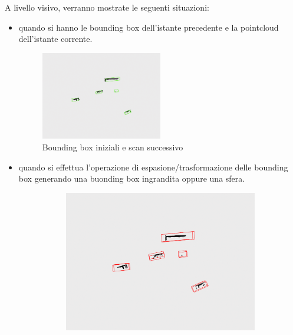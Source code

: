 \documentclass[italian]{report}
\begin{document}
A livello visivo, verranno mostrate le seguenti situazioni:
\begin{itemize}
	\item quando si hanno le bounding box dell'istante precedente e la pointcloud dell'istante corrente.
		\begin{figure}[H]
			\centering
			\includegraphics[width=0.5\textwidth]{startingpoint}
			\footnotesize
			\caption{Bounding box iniziali e scan successivo}
		\end{figure}
	\item quando si effettua l'operazione di espasione/trasformazione delle bounding box generando una buonding box ingrandita oppure una sfera.
		\begin{figure}[H]
			\centering
			\begin{subfigure}{0.45\textwidth}
				\includegraphics[width=\textwidth]{bbsExpanded}
			\end{subfigure}
			\begin{subfigure}{0.45\textwidth}

\end{subfigure}
\end{figure}
\end{itemize}
\end{document}
